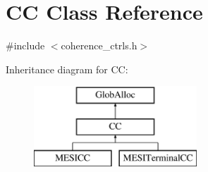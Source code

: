\hypertarget{classCC}{\section{C\-C Class Reference}
\label{classCC}
}


{\ttfamily \#include $<$coherence\-\_\-ctrls.\-h$>$}

Inheritance diagram for C\-C\-:\begin{figure}[H]
\begin{center}
\leavevmode
\includegraphics[height=3.000000cm]{classCC}
\end{center}
\end{figure}
